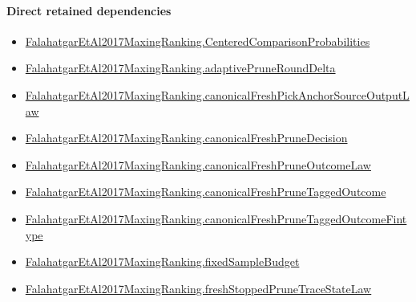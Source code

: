\documentclass[10pt]{article}
\begin{document}
\paragraph{Direct retained dependencies}
\begin{itemize}\raggedright
\item \hyperlink{paper-prerequisite-b99b697ef57f53ce}{Falahatgar\allowbreak{}Et\allowbreak{}Al2017\allowbreak{}Maxing\allowbreak{}Ranking.\allowbreak{}Centered\allowbreak{}Comparison\allowbreak{}Probabilities}
\item \hyperlink{governing-declaration-0a2d9c4ad2e46f08}{Falahatgar\allowbreak{}Et\allowbreak{}Al2017\allowbreak{}Maxing\allowbreak{}Ranking.\allowbreak{}adaptive\allowbreak{}Prune\allowbreak{}Round\allowbreak{}Delta}
\item \hyperlink{governing-declaration-c9504cf8a39d2ae0}{Falahatgar\allowbreak{}Et\allowbreak{}Al2017\allowbreak{}Maxing\allowbreak{}Ranking.\allowbreak{}canonical\allowbreak{}Fresh\allowbreak{}Pick\allowbreak{}Anchor\allowbreak{}Source\allowbreak{}Output\allowbreak{}Law}
\item \hyperlink{governing-declaration-5f4aa5a2143dcc9f}{Falahatgar\allowbreak{}Et\allowbreak{}Al2017\allowbreak{}Maxing\allowbreak{}Ranking.\allowbreak{}canonical\allowbreak{}Fresh\allowbreak{}Prune\allowbreak{}Decision}
\item \hyperlink{governing-declaration-2d276a1a3b14a7e3}{Falahatgar\allowbreak{}Et\allowbreak{}Al2017\allowbreak{}Maxing\allowbreak{}Ranking.\allowbreak{}canonical\allowbreak{}Fresh\allowbreak{}Prune\allowbreak{}Outcome\allowbreak{}Law}
\item \hyperlink{governing-declaration-3a0933a8178fc16e}{Falahatgar\allowbreak{}Et\allowbreak{}Al2017\allowbreak{}Maxing\allowbreak{}Ranking.\allowbreak{}canonical\allowbreak{}Fresh\allowbreak{}Prune\allowbreak{}Tagged\allowbreak{}Outcome}
\item \hyperlink{governing-declaration-6e0ce93b44515012}{Falahatgar\allowbreak{}Et\allowbreak{}Al2017\allowbreak{}Maxing\allowbreak{}Ranking.\allowbreak{}canonical\allowbreak{}Fresh\allowbreak{}Prune\allowbreak{}Tagged\allowbreak{}Outcome\allowbreak{}Fintype}
\item \hyperlink{governing-declaration-4b4daf4bb2493573}{Falahatgar\allowbreak{}Et\allowbreak{}Al2017\allowbreak{}Maxing\allowbreak{}Ranking.\allowbreak{}fixed\allowbreak{}Sample\allowbreak{}Budget}
\item \hyperlink{paper-prerequisite-2c688a8303bceb83}{Falahatgar\allowbreak{}Et\allowbreak{}Al2017\allowbreak{}Maxing\allowbreak{}Ranking.\allowbreak{}fresh\allowbreak{}Stopped\allowbreak{}Prune\allowbreak{}Trace\allowbreak{}State\allowbreak{}Law}

\end{itemize}
\end{document}

